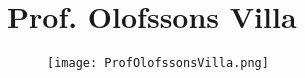 \section{Prof. Olofssons Villa}
%
\begin{figure}[h]
\texttt{[image: ProfOlofssonsVilla.png]}
\centering
\end{figure}
%
